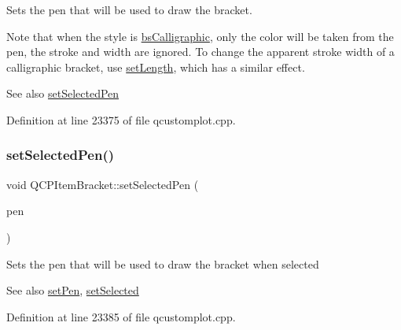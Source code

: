 Sets the pen that will be used to draw the bracket.

Note that when the style is \hyperlink{class_q_c_p_item_bracket_a7ac3afd0b24a607054e7212047d59dbda8f29f5ef754e2dc9a9efdedb2face0f3}{bs\+Calligraphic}, only the color will be taken from the pen, the stroke and width are ignored. To change the apparent stroke width of a calligraphic bracket, use \hyperlink{class_q_c_p_item_bracket_ac7cfc3da7da9b5c5ac5dfbe4f0351b2a}{set\+Length}, which has a similar effect.

\begin{DoxySeeAlso}{See also}
\hyperlink{class_q_c_p_item_bracket_a349785c31122778a520c64891fa204c5}{set\+Selected\+Pen} 
\end{DoxySeeAlso}


Definition at line 23375 of file qcustomplot.\+cpp.

\mbox{\label{class_q_c_p_item_bracket_a349785c31122778a520c64891fa204c5}} 
\subsubsection{\texorpdfstring{set\+Selected\+Pen()}{setSelectedPen()}}
{\footnotesize\ttfamily void Q\+C\+P\+Item\+Bracket\+::set\+Selected\+Pen (\begin{DoxyParamCaption}\item[{const Q\+Pen \&}]{pen }\end{DoxyParamCaption})}

Sets the pen that will be used to draw the bracket when selected

\begin{DoxySeeAlso}{See also}
\hyperlink{class_q_c_p_item_bracket_ab13001d9cc5d8f9e56ea15bdda682acb}{set\+Pen}, \hyperlink{class_q_c_p_abstract_item_a203de94ad586cc44d16c9565f49d3378}{set\+Selected} 
\end{DoxySeeAlso}


Definition at line 23385 of file qcustomplot.\+cpp.

\mbox{\label{class_q_c_p_item_bracket_a612dffa2373422eef8754d690add3703}} 
